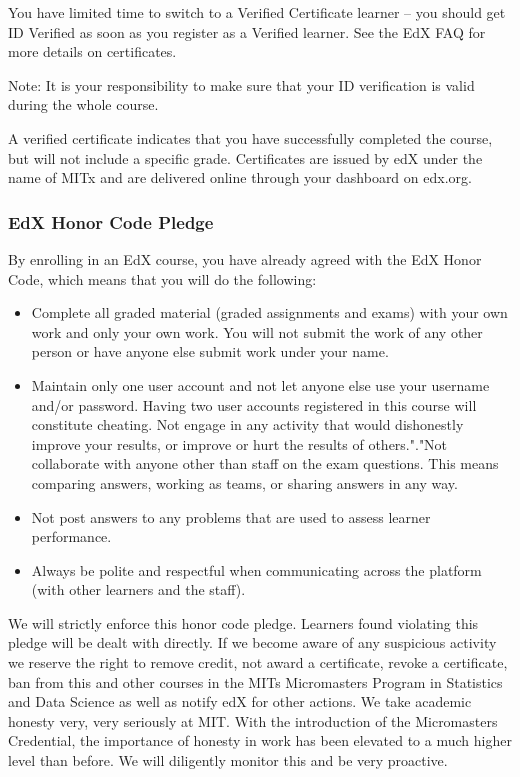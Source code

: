 \documentclass[pdftex, brazil, 12pt, twoside]{article}
\begin{document}
You have limited time to switch to a Verified Certificate learner – you should
get ID Verified as soon as you register as a Verified learner. See the EdX FAQ
for more details on certificates.

Note: It is your responsibility to make sure that your ID verification is valid
during the whole course.

A verified certificate indicates that you have successfully completed the course,
but will not include a specific grade. Certificates are issued by edX under the
name of MITx and are delivered online through your dashboard on edx.org.

\subsubsection{EdX Honor Code Pledge}
\label{ovw0-mm-honor}

By enrolling in an EdX course, you have already agreed with the EdX Honor Code,
which means that you will do the following:

\begin{itemize}[noitemsep]
\item Complete all graded material (graded assignments and exams) with your
  own work and only your own work. You will not submit the work of any other
  person or have anyone else submit work under your name.
\item Maintain only one user account and not let anyone else use your username
  and/or password. Having two user accounts registered in this course will
  constitute cheating. Not engage in any activity that would dishonestly improve
  your results, or improve or hurt the results of others."."Not collaborate with
  anyone other than staff on the exam questions. This means comparing answers,
  working as teams, or sharing answers in any way.
\item Not post answers to any problems that are used to assess learner performance.
\item Always be polite and respectful when communicating across the platform
  (with other learners and the staff).
\end{itemize}

We will strictly enforce this honor code pledge. Learners found violating this
pledge will be dealt with directly. If we become aware of any suspicious activity
we reserve the right to remove credit, not award a certificate, revoke a certificate,
ban from this and other courses in the MITs Micromasters Program in Statistics and
Data Science as well as notify edX for other actions. We take academic honesty very,
very seriously at MIT. With the introduction of the Micromasters Credential, the
importance of honesty in work has been elevated to a much higher level than before.
We will diligently monitor this and be very proactive. 
\end{document}
